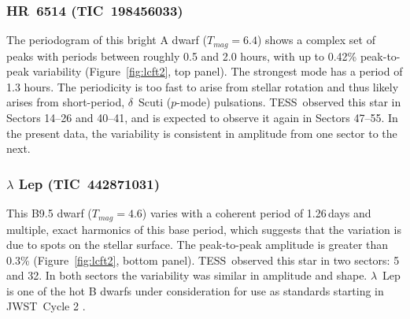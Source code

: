 \documentclass[twocolumn, linenumbers]{aastex631}
\newcommand{\jwst}{JWST}
\newcommand{\tess}{TESS}
\begin{document}
\subsubsection{HR~6514 (TIC~198456033)} %

The periodogram of this bright A dwarf ($T_{mag}=6.4$) shows a complex set of peaks with periods between roughly 0.5 and 2.0 hours, with up to 0.42\% peak-to-peak variability (Figure~\ref{fig:lcft2}, top panel).  The strongest mode has a period of 1.3 hours.  The periodicity is too fast to arise from stellar rotation and thus likely arises from short-period, $\delta$~Scuti ($p$-mode) pulsations.  \tess\ observed this star in Sectors 14--26 and 40--41, and is expected to observe it again in Sectors 47--55.  In the present data, the variability is consistent in amplitude from one sector to the next. 


\subsubsection{$\lambda$ Lep (TIC~442871031)}

This B9.5 dwarf ($T_{mag}=4.6$) varies with a coherent period of 1.26\,days and multiple, exact harmonics of this base period, which suggests that the variation is due to spots on the stellar surface. The peak-to-peak amplitude is greater than 0.3\% (Figure~\ref{fig:lcft2}, bottom panel). \tess\ observed this star in two sectors: 5 and 32. In both sectors the variability was similar in amplitude and shape. $\lambda$~Lep is one of the hot B dwarfs under consideration for use as standards starting in \jwst\ Cycle 2 \citep{Gordon2022inprep}. 
\end{document}
